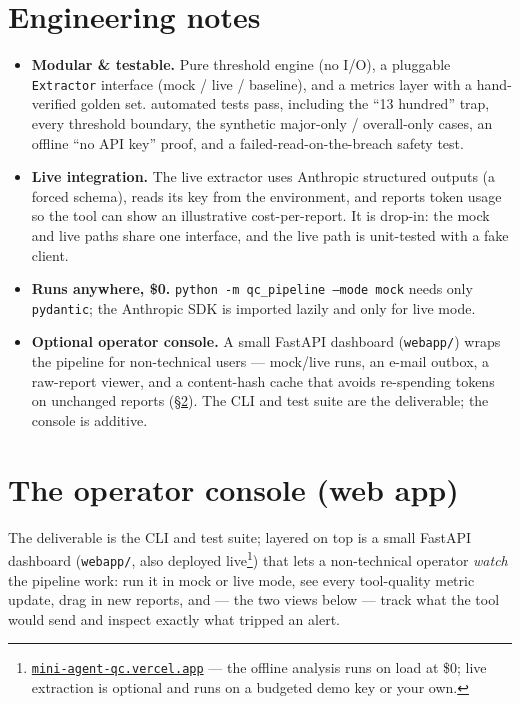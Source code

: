\documentclass[11pt]{article}
\newcommand{\code}[1]{\texttt{\small #1}}
\begin{document}
\section{Engineering notes}
\begin{itemize}[leftmargin=1.4em,itemsep=2pt]
  \item \textbf{Modular \& testable.} Pure threshold engine (no I/O), a pluggable
    \code{Extractor} interface (mock / live / baseline), and a metrics layer with a
    hand-verified golden set. \nTests{} automated tests pass, including the ``13 hundred''
    trap, every threshold boundary, the synthetic major-only / overall-only cases, an
    offline ``no API key'' proof, and a failed-read-on-the-breach safety test.
  \item \textbf{Live integration.} The live extractor uses Anthropic structured outputs
    (a forced schema), reads its key from the environment, and reports token usage so the
    tool can show an illustrative cost-per-report. It is drop-in: the mock and live paths
    share one interface, and the live path is unit-tested with a fake client.
  \item \textbf{Runs anywhere, \$0.} \code{python -m qc\_pipeline --mode mock} needs only
    \code{pydantic}; the Anthropic SDK is imported lazily and only for live mode.
  \item \textbf{Optional operator console.} A small FastAPI dashboard (\code{webapp/}) wraps
    the pipeline for non-technical users --- mock/live runs, an e-mail outbox, a raw-report
    viewer, and a content-hash cache that avoids re-spending tokens on unchanged reports
    (\S\ref{sec:console}). The CLI and test suite are the deliverable; the console is additive.
\end{itemize}

\section{The operator console (web app)}\label{sec:console}
The deliverable is the CLI and test suite; layered on top is a small FastAPI dashboard
(\code{webapp/}, also deployed live\footnote{\href{https://mini-agent-qc.vercel.app}{\nolinkurl{mini-agent-qc.vercel.app}} --- the offline analysis runs on load at \$0; live extraction is optional and runs on a budgeted demo key or your own.})
that lets a non-technical operator \emph{watch} the pipeline work: run it in mock or live mode,
see every tool-quality metric update, drag in new reports, and --- the two views below --- track what
the tool would send and inspect exactly what tripped an alert.
\end{document}
